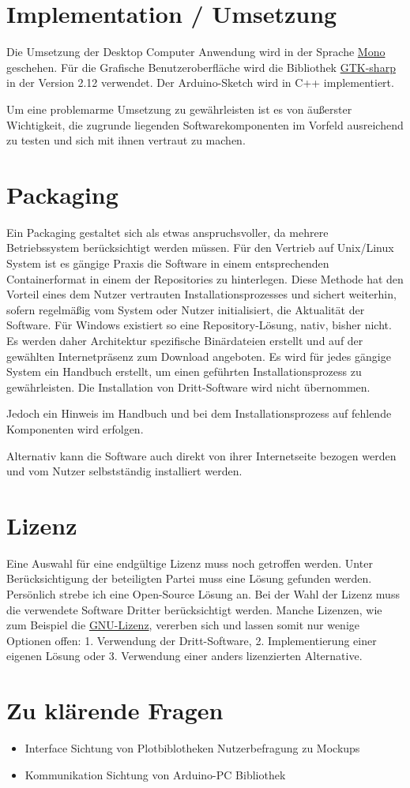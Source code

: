 \section{Implementation / Umsetzung}
Die Umsetzung der Desktop Computer Anwendung wird in der Sprache \href{http://www.mono-project.com/}{Mono} geschehen. Für die Grafische Benutzeroberfläche wird die Bibliothek \href{http://www.gtk.org/}{GTK-sharp} in der Version 2.12 verwendet. Der Arduino-Sketch wird in C++ implementiert.

Um eine problemarme Umsetzung zu gewährleisten ist es von äußerster Wichtigkeit, die zugrunde liegenden Softwarekomponenten im Vorfeld ausreichend zu testen und sich mit ihnen vertraut zu machen. 
\section{Packaging}
Ein Packaging gestaltet sich als etwas anspruchsvoller, da mehrere Betriebssystem berücksichtigt werden müssen. Für den Vertrieb auf Unix/Linux System ist es gängige Praxis die Software in einem entsprechenden Containerformat in einem der Repositories zu hinterlegen. Diese Methode hat den Vorteil eines dem Nutzer vertrauten Installationsprozesses und sichert weiterhin, sofern regelmäßig vom System oder Nutzer initialisiert, die Aktualität der Software. 
Für Windows existiert so eine Repository-Lösung, nativ, bisher nicht. Es werden daher Architektur spezifische Binärdateien erstellt und auf der gewählten Internetpräsenz zum Download angeboten. 
Es wird für jedes gängige System ein Handbuch erstellt, um einen geführten Installationsprozess zu gewährleisten.
Die Installation von Dritt-Software wird nicht übernommen. 

Jedoch ein Hinweis im Handbuch und bei dem Installationsprozess auf fehlende Komponenten wird erfolgen.

Alternativ kann die Software auch direkt von ihrer Internetseite bezogen werden und vom Nutzer selbstständig installiert werden.
\section{Lizenz}
Eine Auswahl für eine endgültige Lizenz muss noch getroffen werden. Unter Berücksichtigung der beteiligten Partei muss eine Lösung gefunden werden. Persönlich strebe ich eine Open-Source Lösung an.
Bei der Wahl der Lizenz muss die verwendete Software Dritter berücksichtigt werden. Manche Lizenzen, wie zum Beispiel die \href{https://www.gnu.org/licenses/licenses.html#GPL}{GNU-Lizenz}, vererben sich und lassen somit nur wenige Optionen offen: 1. Verwendung der Dritt-Software, 2. Implementierung einer eigenen Lösung oder 3. Verwendung einer anders lizenzierten Alternative.
\section{Zu klärende Fragen}
\begin{itemize}
 \item Interface
  \subitem Sichtung von Plotbiblotheken
  \subitem Nutzerbefragung zu Mockups
 \item Kommunikation
  \subitem Sichtung von Arduino-PC Bibliothek  
\end{itemize}


